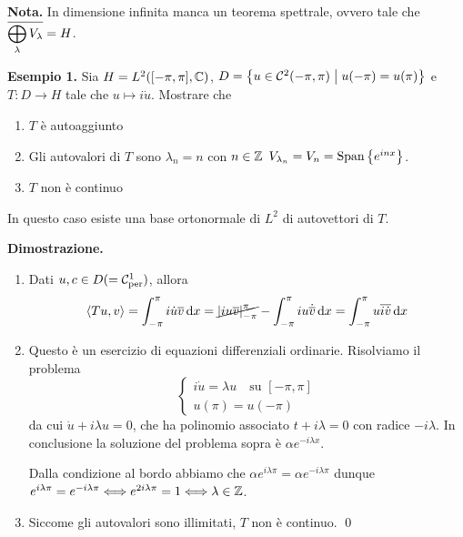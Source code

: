 \textbf{Nota.} In dimensione infinita manca un teorema spettrale, ovvero tale che $\displaystyle \overline{\bigoplus_\lambda V_\lambda} = H$.

\newpage

\textbf{Esempio 1.} Sia $H = L^2([-\pi,\pi],\mathbb C)$, $D = \left\{ u \in \mathcal{C}^2 (-\pi,\pi) \;\middle|\; u(-\pi) = u(\pi) \right\}$ e $T \colon D \to H$ tale che $u \mapsto i\dot u$.
Mostrare che
\begin{enumerate}

	\item $T$ è autoaggiunto

	\item Gli autovalori di $T$ sono $\lambda_n = n$ con $n \in \mathbb Z$ $V_{\lambda_n} = V_n = \operatorname{Span} \left\{ e^{inx} \right\}$.

	\item $T$ non è continuo

\end{enumerate}


In questo caso esiste una base ortonormale di $L^2$ di autovettori di $T$.

\textbf{Dimostrazione.} 
\begin{enumerate}

	\item Dati $u,c \in D (= \mathcal{C}_{\operatorname{per}}^1)$, allora
	$$
		\left<Tu,v \right> = \int_{-\pi}^\pi i \dot u \overline{v} \,\mathrm{d} x
		= \cancel{\left| iu\overline{v} \right|_{-\pi}^\pi} - \int_{-\pi}^\pi iu \dot{\overline{v}} \,\mathrm{d} x
		= \int_{-\pi}^\pi u \overline{i\dot v} \,\mathrm{d} x
	$$

	\item Questo è un esercizio di equazioni differenziali ordinarie. Risolviamo il problema
	$$
	\begin{cases}
		i\dot u = \lambda u \quad \text{su } [-\pi,\pi] \\
		u(\pi) = u(-\pi)
	\end{cases} 
	$$
	da cui $\dot u + i \lambda u = 0$, che ha polinomio associato $t + i\lambda = 0$ con radice  $-i\lambda$. In conclusione la soluzione del problema sopra è $\alpha e^{-i\lambda x}$.

	Dalla condizione al bordo abbiamo che $\alpha e^{i\lambda \pi} = \alpha e^{-i\lambda \pi}$ dunque $e^{i\lambda \pi} = e^{- i\lambda \pi} \Longleftrightarrow e^{2i\lambda \pi} = 1 \Longleftrightarrow \lambda \in \mathbb Z$.


	\item Siccome gli autovalori sono illimitati, $T$ non è continuo.
\qed

\end{enumerate}


